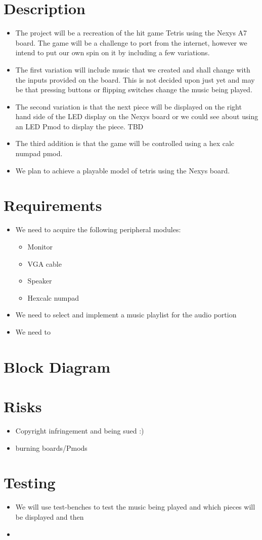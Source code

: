 \section{Description}
    \begin{itemize}
        \item The project will be a recreation of the hit game Tetris using the Nexys A7 board. The game will be a challenge to port from the internet, however we intend to put our own spin on it by including a few variations.
        \item The first variation will include music that we created and shall change with the inputs provided on the board. This is not decided upon just yet and may be that pressing buttons or flipping switches change the music being played.
        \item The second variation is that the next piece will be displayed on the right hand side of the LED display on the Nexys board or we could see about using an LED Pmod to display the piece. TBD
        \item The third addition is that the game will be controlled using a hex calc numpad pmod.
        \item We plan to achieve a playable model of tetris using the Nexys board.
    \end{itemize}
\section{Requirements}
    \begin{itemize}
        \item We need to acquire the following peripheral modules:
            \begin{itemize}
                \item Monitor
                \item VGA cable
                \item Speaker
                \item Hexcalc numpad
            \end{itemize}
        \item We need to select and implement a music playlist for the audio portion
        \item We need to 
    \end{itemize}
\section{Block Diagram}
\section{Risks}
    \begin{itemize}
        \item Copyright infringement and being sued :)
        \item burning boards/Pmods
    \end{itemize}
\section{Testing}
    \begin{itemize}
        \item We will use test-benches to test the music being played and which pieces will be displayed and then 
        \item 
    \end{itemize}
